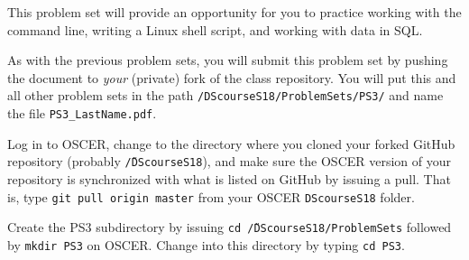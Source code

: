 \documentclass[12pt,english]{exam}
\begin{document}
This problem set will provide an opportunity for you to practice working with the command line, writing a Linux shell script, and working with data in SQL.

As with the previous problem sets, you will submit this problem set by pushing the document to \emph{your} (private) fork of the class repository. You will put this and all other problem sets in the path \texttt{/DScourseS18/ProblemSets/PS3/} and name the file \texttt{PS3\_LastName.pdf}.
\begin{questions}
\question Log in to OSCER, change to the directory where you cloned your forked GitHub repository (probably \texttt{\~/DScourseS18}), and make sure the OSCER version of your repository is synchronized with what is listed on GitHub by issuing a pull. That is, type \texttt{git pull origin master} from your OSCER \texttt{DScourseS18} folder. 

\question Create the PS3 subdirectory by issuing \texttt{cd \~/DScourseS18/ProblemSets} followed by \texttt{mkdir PS3} on OSCER. Change into this directory by typing \texttt{cd PS3}.


\end{questions}
\end{document}
